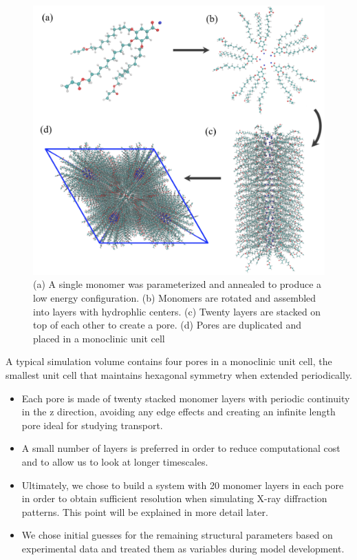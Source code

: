 \documentclass{article}
\begin{document}
  \begin{figure}[!ht]
	\centering
	\includegraphics[width=0.75\linewidth]{build.PNG} %
	\caption{(a) A single monomer was parameterized and annealed to produce a low energy
		configuration. (b) Monomers are rotated and assembled into layers with 
		hydrophlic centers. (c) Twenty layers are stacked on top of each other to create
		a pore. (d) Pores are duplicated and placed in a monoclinic unit cell}\label{fig:python}
  \end{figure}
  
  A typical simulation volume contains four pores in a monoclinic unit cell,
  the smallest unit cell that maintains hexagonal symmetry when extended 
  periodically.
  \begin{itemize}
    \item Each pore is made of twenty stacked monomer layers with periodic 
    continuity in the z direction, avoiding any edge effects and creating an 
    infinite length pore ideal for studying transport.
    \item A small number of layers is preferred in order to reduce computational
    cost and to allow us to look at longer timescales.
    \item Ultimately, we chose to build a system with 20 monomer layers in each pore
    in order to obtain sufficient resolution when simulating X-ray diffraction patterns.
    This point will be explained in more detail later.
    \item We chose initial guesses for the remaining structural parameters based on
    experimental data and treated them as variables during model development.
  \end{itemize}
  
\end{document}
